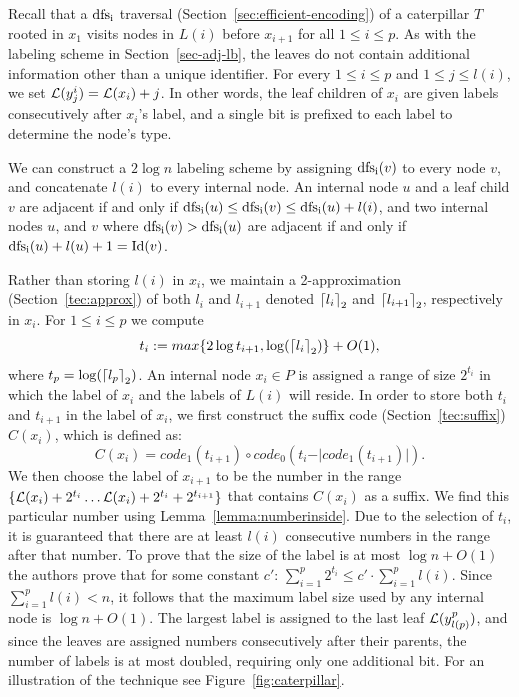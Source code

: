 Recall that  a $\operatorname{dfs_i}$  traversal (Section~\ref{sec:efficient-encoding}) of a   caterpillar $T$  rooted in    $x_1$ visits nodes in $L(i)$ before  $x_{i+1}$ for all $1 \leq i \leq p $. As with the labeling scheme in Section~\ref{sec-adj-lb}, the leaves do not contain additional information other than a unique identifier. For every $1 \leq i \leq p $ and $1 \leq   j \leq l(i)$, we set $ \mathcal{L}(y_j^i) =  \mathcal{L}(x_i)+ j$.  In other words, the leaf children of $x_i$ are given labels  consecutively after $x_i$'s label, and a single bit is  prefixed to each label to determine the node's type.  

 We can construct a  $2 \log n$  \adjacency labeling scheme by assigning $\operatorname{dfs_i}(v)$ to every node $v$, and concatenate    $l(i)$ to  every internal node.
 An internal node $u$ and a  leaf child $v$ are adjacent if and only if  $\operatorname{dfs_i}(u) \leq \operatorname{dfs_i}(v) \leq \operatorname{dfs_i}(u)+l(i)$, and two internal   nodes $u$, and $v$ where $\operatorname{dfs_i}(v)>\operatorname{dfs_i}(u)$ are adjacent if and only if  $\operatorname{dfs_i}(u)+l(u)+1= \operatorname{Id}(v)$.
 
Rather than storing  $l(i)$ in $x_i$, we  maintain a 2-approximation (Section~\ref{tec:approx}) of both $l_i$ and $l_{i+1}$ denoted 
$\left\lceil{l_i}\right\rceil_2$ and $\left\lceil{l_{i+1}}\right\rceil_2$, respectively in $x_i$. For $1 \leq i \leq p$ we compute  $$t_i := max\{ 2 \log{t_{i+1}}, \log(\left\lceil{l_i}\right\rceil_2 )\}+O(1),$$ where $t_{p} =  \log(\left\lceil{l_p}\right\rceil_2)$. An  internal node $x_i \in P$ is assigned a range of size $2^{t_i}$ in which the label of $x_i$ and the labels of $L(i)$ will reside.  
In order to store both $t_i$ and $t_{i+1}$ in the label of $x_i$, we first construct the suffix code (Section~\ref{tec:suffix}) $C(x_i)$, which is defined as:
$$C(x_i)= code_1(t_{i+1}) \circ code_0(t_i - \vert code_1(t_{i+1}) \vert ).$$
We  then choose the  label of $x_{i+1}$ to be   the  number in the range  
$\{ \mathcal{L}(x_i)+2^{t_i} \dots  \mathcal{L}(x_i)+2^{t_i} + 2^{t_{i+1}}\}$ that  contains $C(x_i)$ as a suffix.
 We find this particular number using Lemma~\ref{lemma:numberinside}. Due to the selection of $t_i$, it is guaranteed that there are at least $l(i)$ consecutive numbers in the range after that number.
To prove that the size of the label  is at most $\log n + O(1)$ the authors prove that for some constant $c'$:
 $\sum_{i=1}^p 2^{t_i} \leq  c' \cdot \sum_{i=1}^p l(i)$. 
  Since $\sum_{i=1}^p l(i) < n$, it follows that the maximum label size used by any internal node is $\log n +O(1)$.  
 The largest label is assigned to the last leaf $ \mathcal{L}(y_{l(p)}^p)$, and since the leaves are assigned numbers consecutively after their parents, the number of labels is at most doubled, requiring only one additional bit. For an illustration of the technique see Figure~\ref{fig:caterpillar}.


